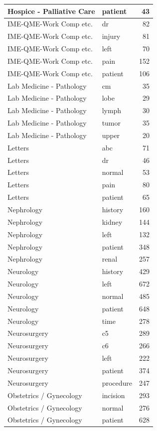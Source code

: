 \documentclass[
]{article}
\begin{document}
\begin{table}
\begin{tabular}{l|l|r}
\hline
Hospice - Palliative Care & patient & 43\\
\hline
IME-QME-Work Comp etc. & dr & 82\\
\hline
IME-QME-Work Comp etc. & injury & 81\\
\hline
IME-QME-Work Comp etc. & left & 70\\
\hline
IME-QME-Work Comp etc. & pain & 152\\
\hline
IME-QME-Work Comp etc. & patient & 106\\
\hline
Lab Medicine - Pathology & cm & 35\\
\hline
Lab Medicine - Pathology & lobe & 29\\
\hline
Lab Medicine - Pathology & lymph & 30\\
\hline
Lab Medicine - Pathology & tumor & 35\\
\hline
Lab Medicine - Pathology & upper & 20\\
\hline
Letters & abc & 71\\
\hline
Letters & dr & 46\\
\hline
Letters & normal & 53\\
\hline
Letters & pain & 80\\
\hline
Letters & patient & 65\\
\hline
Nephrology & history & 160\\
\hline
Nephrology & kidney & 144\\
\hline
Nephrology & left & 132\\
\hline
Nephrology & patient & 348\\
\hline
Nephrology & renal & 257\\
\hline
Neurology & history & 429\\
\hline
Neurology & left & 672\\
\hline
Neurology & normal & 485\\
\hline
Neurology & patient & 648\\
\hline
Neurology & time & 278\\
\hline
Neurosurgery & c5 & 289\\
\hline
Neurosurgery & c6 & 266\\
\hline
Neurosurgery & left & 222\\
\hline
Neurosurgery & patient & 374\\
\hline
Neurosurgery & procedure & 247\\
\hline
Obstetrics / Gynecology & incision & 293\\
\hline
Obstetrics / Gynecology & normal & 276\\
\hline
Obstetrics / Gynecology & patient & 628\\

\end{tabular}
\end{table}
\end{document}
